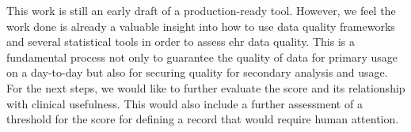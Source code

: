 This work is still an early draft of a production-ready tool. However, we feel the work done is already a valuable insight into how to use data quality frameworks and several statistical tools in order to assess ehr data quality.
This is a fundamental process not only to guarantee the quality of data for primary usage on a day-to-day but also for securing quality for secondary analysis and usage.
For the next steps, we would like to further evaluate the score and its relationship with clinical usefulness. This would also include a further assessment of a  threshold for the score for defining a record that would require human attention.
